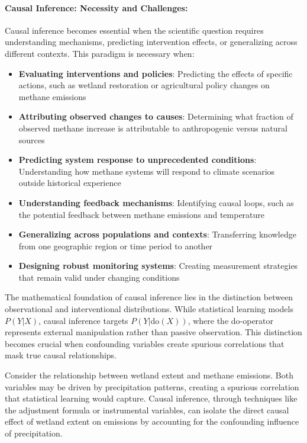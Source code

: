 \paragraph{Causal Inference: Necessity and Challenges:}

Causal inference becomes essential when the scientific question requires understanding mechanisms, predicting intervention effects, or generalizing across different contexts. This paradigm is necessary when:

\begin{itemize}
	\item \textbf{Evaluating interventions and policies}: Predicting the effects of specific actions, such as wetland restoration or agricultural policy changes on methane emissions
	\item \textbf{Attributing observed changes to causes}: Determining what fraction of observed methane increase is attributable to anthropogenic versus natural sources
	\item \textbf{Predicting system response to unprecedented conditions}: Understanding how methane systems will respond to climate scenarios outside historical experience
	\item \textbf{Understanding feedback mechanisms}: Identifying causal loops, such as the potential feedback between methane emissions and temperature
	\item \textbf{Generalizing across populations and contexts}: Transferring knowledge from one geographic region or time period to another
	\item \textbf{Designing robust monitoring systems}: Creating measurement strategies that remain valid under changing conditions
\end{itemize}

The mathematical foundation of causal inference lies in the distinction between observational and interventional distributions. While statistical learning models $P(Y|X)$, causal inference targets $P(Y|\text{do}(X))$, where the do-operator represents external manipulation rather than passive observation. This distinction becomes crucial when confounding variables create spurious correlations that mask true causal relationships.

Consider the relationship between wetland extent and methane emissions. Both variables may be driven by precipitation patterns, creating a spurious correlation that statistical learning would capture. Causal inference, through techniques like the adjustment formula or instrumental variables, can isolate the direct causal effect of wetland extent on emissions by accounting for the confounding influence of precipitation.

